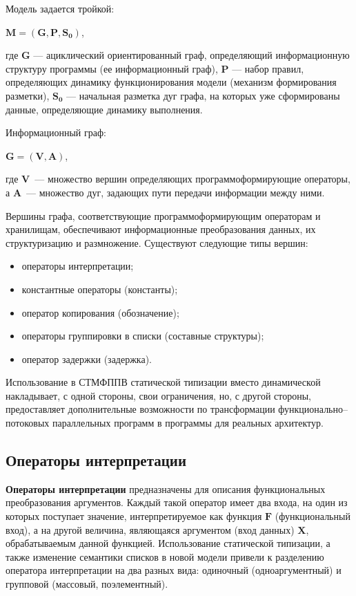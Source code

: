 Модель задается тройкой:

\begin{center}
	\large$\mathbf{M = ( G, P, S_0 )}$\normalsize,
\end{center}
где $\mathbf{G}$ --- ациклический ориентированный граф, определяющий информационную структуру программы (ее информационный граф), $\mathbf{P}$ --- набор правил, определяющих динамику функционирования модели (механизм формирования разметки), $\mathbf{S_0}$ --- начальная разметка дуг графа, на которых уже сформированы данные, определяющие динамику выполнения.

Информационный граф:

\begin{center}
	\large$\mathbf{G = ( V, A )}$\normalsize,
\end{center}
где $\mathbf{V}$~--- множество вершин определяющих программоформирующие операторы, а $\mathbf{A}$~--- множество дуг, задающих пути передачи информации между ними.

Вершины графа, соответствующие программоформирующим операторам и хранилищам, обеспечивают информационные преобразования данных, их структуризацию и размножение. Существуют следующие типы вершин:
\begin{itemize}
	\item операторы интерпретации;
	\item константные операторы (константы);
	\item оператор копирования (обозначение);
	\item операторы группировки в списки (составные структуры);
	\item оператор задержки (задержка).
\end{itemize}
Использование в СТМФППВ статической типизации вместо динамической накладывает, с одной стороны, свои ограничения, но, с другой стороны, предоставляет дополнительные возможности по трансформации функционально--потоковых параллельных программ в программы для реальных архитектур.

\subsection{Операторы интерпретации}

\textbf{Операторы интерпретации} предназначены для описания функциональных преобразования аргументов. Каждый такой оператор имеет два входа, на один из которых поступает значение, интерпретируемое как функция $\mathbf{F}$ (функциональный вход), а на другой величина, являющаяся аргументом (вход данных) $\mathbf{X}$, обрабатываемым данной функцией. Использование статической типизации, а также изменение семантики списков в новой модели привели к разделению оператора интерпретации на два разных вида: одиночный (одноаргументный) и групповой (массовый, поэлементный). 

